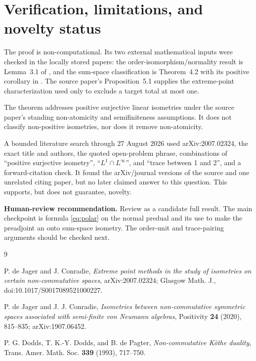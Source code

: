 \documentclass[11pt]{article}
\begin{document}
\section{Verification, limitations, and novelty status}

The proof is non-computational.  Its two external mathematical inputs were
checked in the locally stored papers: the order-isomorphism/normality result is
Lemma~3.1 of \cite{deJagerConradieSymmetric}, and the sum-space classification
is Theorem~4.2 with its positive corollary in
\cite{deJagerConradieExtreme}.  The source paper's Proposition~5.1 supplies
the extreme-point characterization used only to exclude a target total at
most one.

The theorem addresses positive surjective linear isometries under the source
paper's standing non-atomicity and semifiniteness assumptions.  It does not
classify non-positive isometries, nor does it remove non-atomicity.

A bounded literature search through 27 August 2026 used arXiv:2007.02324, the
exact title and authors, the quoted open-problem phrase, combinations of
``positive surjective isometry'', ``$L^1\cap L^\infty$'', and ``trace between
1 and 2'', and a forward-citation check.  It found the arXiv/journal versions
of the source and one unrelated citing paper, but no later claimed answer to
this question.  This supports, but does not guarantee, novelty.

\medskip
\noindent\textbf{Human-review recommendation.}
Review as a candidate full result.  The main checkpoint is formula
\eqref{eq:polar} on the normal predual and its use to make the preadjoint an
onto sum-space isometry.  The order-unit and trace-pairing arguments should be
checked next.

\begin{thebibliography}{9}

P. de Jager and J. Conradie,
\emph{Extreme point methods in the study of isometries on certain
non-commutative spaces}, arXiv:2007.02324; Glasgow Math. J.,
doi:10.1017/S0017089521000227.

P. de Jager and J. J. Conradie,
\emph{Isometries between non-commutative symmetric spaces associated with
semi-finite von Neumann algebras}, Positivity \textbf{24} (2020), 815--835;
arXiv:1907.06452.

P. G. Dodds, T. K.-Y. Dodds, and B. de Pagter,
\emph{Non-commutative K\"othe duality}, Trans. Amer. Math. Soc.
\textbf{339} (1993), 717--750.

\end{thebibliography}
\end{document}
